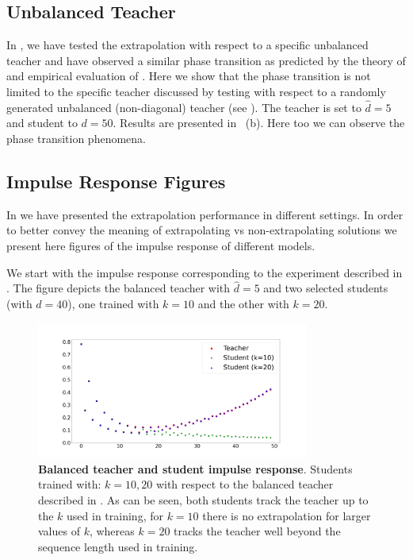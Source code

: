 \subsection{Unbalanced Teacher}\label{sec:apdx:unbalanced_teacher}
In , we have tested the extrapolation with respect to a specific unbalanced teacher and have observed a similar phase transition as predicted by the theory of  and empirical evaluation of . Here we show that the phase transition is not limited to the specific teacher discussed by testing with respect to a randomly generated unbalanced (non-diagonal) teacher (see ). The teacher is set to $\hat{d}=5$ and student to $d=50$. Results are presented in ~(b). Here too we can observe the phase transition phenomena.


\subsection{Impulse Response Figures}
In  we have presented the extrapolation performance in different settings. In order to better convey the meaning of extrapolating vs non-extrapolating solutions we present here figures of the impulse response of different models.

We start with the impulse response corresponding to the experiment described in . The figure depicts the balanced teacher with $\hat{d}=5$ and two selected students (with $d=40$), one trained with $k=10$ and the other with $k=20$.

\begin{figure}[H]
    \centering
    \includegraphics[width=0.8\textwidth]{figures/balanced_impulse_responses.png}
    \caption{\textbf{Balanced teacher and student impulse response}. Students trained with: $k=10,20$ with respect to the balanced teacher described in . As can be seen, both students track the teacher up to the $k$ used in training, for $k=10$ there is no extrapolation for larger values of $k$, whereas $k=20$ tracks the teacher well beyond the sequence length used in training.}
    \label{fig:apdx:balanced_ir}
\end{figure}

